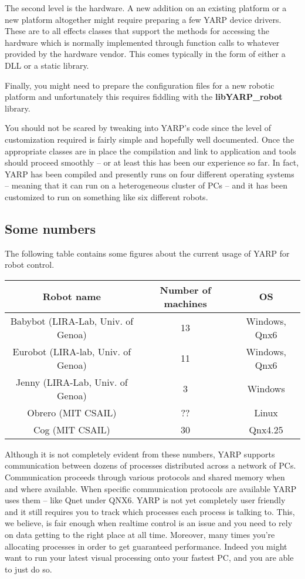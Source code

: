 The second level is the hardware. A new addition on an existing platform or a new platform altogether might require preparing a few YARP device drivers. These are to all effects classes that support the methods for accessing the hardware which is normally implemented through function calls to whatever provided by the hardware vendor. This comes typically in the form of either a DLL or a static library.

Finally, you might need to prepare the configuration files for a new robotic platform and unfortunately this requires fiddling with the {\bf libYARP\_robot} library.

You should not be scared by tweaking into YARP's code since the level of customization required is fairly simple and hopefully well documented. Once the appropriate classes are in place the compilation and link to application and tools should proceed smoothly -- or at least this has been our experience so far. In fact, YARP has been compiled and presently runs on four different operating systems -- meaning that it can run on a heterogeneous cluster of PCs -- and it has been customized to run on something like six different robots.

\subsection{Some numbers}
The following table contains some figures about the current usage of YARP for robot control.
\begin{table}[h]
	\centering
		\begin{tabular}{|c|c|c|}
		\hline
			Robot name & Number of machines & OS \\
			\hline \hline
			Babybot (LIRA-Lab, Univ. of Genoa) & 13 & Windows, Qnx6 \\
			\hline
			Eurobot (LIRA-lab, Univ. of Genoa) & 11 & Windows, Qnx6 \\
			\hline
			Jenny (LIRA-Lab, Univ. of Genoa) & 3 & Windows \\
			\hline
			Obrero (MIT CSAIL) & ?? & Linux \\
			\hline
			Cog (MIT CSAIL) & 30 & Qnx4.25 \\
			\hline
		\end{tabular}
\end{table}

Although it is not completely evident from these numbers, YARP supports communication between dozens of processes distributed across a network of PCs. Communication proceeds through various protocols and shared memory when and where available. When specific communication protocols are available YARP uses them -- like Qnet under QNX6. YARP is not yet completely user friendly and it still requires you to track which processes each process is talking to. This, we believe, is fair enough when realtime control is an issue and you need to rely on data getting to the right place at all time. Moreover, many times you're allocating processes in order to get guaranteed performance. Indeed you might want to run your latest visual processing onto your fastest PC, and you are able to just do so.

